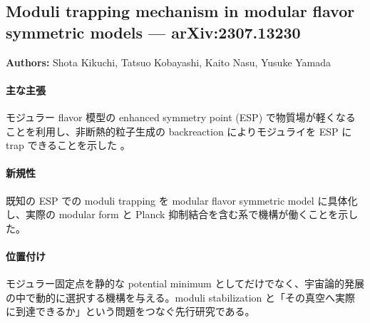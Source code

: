 \subsection{Moduli trapping mechanism in modular flavor symmetric models --- arXiv:2307.13230}

\textbf{Authors:} Shota Kikuchi, Tatsuo Kobayashi, Kaito Nasu, Yusuke Yamada

\paragraph{主な主張}
モジュラー flavor 模型の enhanced symmetry point (ESP) で物質場が軽くなることを利用し、非断熱的粒子生成の backreaction によりモジュライを ESP に trap できることを示した \cite{Kikuchi:2023moduli}。

\paragraph{新規性}
既知の ESP での moduli trapping \cite{Kofman:2004beauty} を modular flavor symmetric model に具体化し、実際の modular form と Planck 抑制結合を含む系で機構が働くことを示した。

\paragraph{位置付け}
モジュラー固定点を静的な potential minimum としてだけでなく、宇宙論的発展の中で動的に選択する機構を与える。moduli stabilization と「その真空へ実際に到達できるか」という問題をつなぐ先行研究である。
